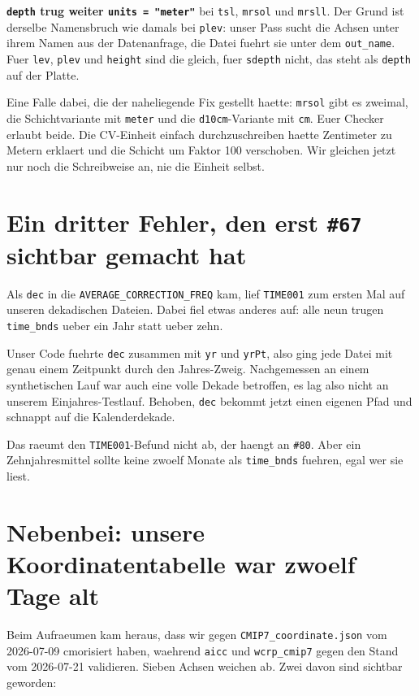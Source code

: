\documentclass[11pt,a4paper]{article}
\newcommand{\code}[1]{\texttt{\small #1}}
\begin{document}
\textbf{\code{depth} trug weiter \code{units = "meter"}} bei \code{tsl},
\code{mrsol} und \code{mrsll}. Der Grund ist derselbe Namensbruch wie damals bei
\code{plev}: unser Pass sucht die Achsen unter ihrem Namen aus der Datenanfrage, die
Datei fuehrt sie unter dem \code{out\_name}. Fuer \code{lev}, \code{plev} und
\code{height} sind die gleich, fuer \code{sdepth} nicht, das steht als \code{depth}
auf der Platte.

Eine Falle dabei, die der naheliegende Fix gestellt haette: \code{mrsol} gibt es
zweimal, die Schichtvariante mit \code{meter} und die \code{d10cm}-Variante mit
\code{cm}. Euer Checker erlaubt beide. Die CV-Einheit einfach durchzuschreiben
haette Zentimeter zu Metern erklaert und die Schicht um Faktor 100 verschoben. Wir
gleichen jetzt nur noch die Schreibweise an, nie die Einheit selbst.

\section{Ein dritter Fehler, den erst \code{\#67} sichtbar gemacht hat}

Als \code{dec} in die \code{AVERAGE\_CORRECTION\_FREQ} kam, lief \code{TIME001}
zum ersten Mal auf unseren dekadischen Dateien. Dabei fiel etwas anderes auf:
alle neun trugen \code{time\_bnds} ueber ein Jahr statt ueber zehn.

Unser Code fuehrte \code{dec} zusammen mit \code{yr} und \code{yrPt}, also ging
jede Datei mit genau einem Zeitpunkt durch den Jahres-Zweig. Nachgemessen an
einem synthetischen Lauf war auch eine volle Dekade betroffen, es lag also nicht
an unserem Einjahres-Testlauf. Behoben, \code{dec} bekommt jetzt einen eigenen
Pfad und schnappt auf die Kalenderdekade.

Das raeumt den \code{TIME001}-Befund nicht ab, der haengt an \code{\#80}. Aber
ein Zehnjahresmittel sollte keine zwoelf Monate als \code{time\_bnds} fuehren, egal
wer sie liest.

\section{Nebenbei: unsere Koordinatentabelle war zwoelf Tage alt}

Beim Aufraeumen kam heraus, dass wir gegen \code{CMIP7\_coordinate.json}
vom 2026-07-09 cmorisiert haben, waehrend \code{aicc} und \code{wcrp\_cmip7} gegen
den Stand vom 2026-07-21 validieren. Sieben Achsen weichen ab. Zwei davon sind
sichtbar geworden:
\end{document}
